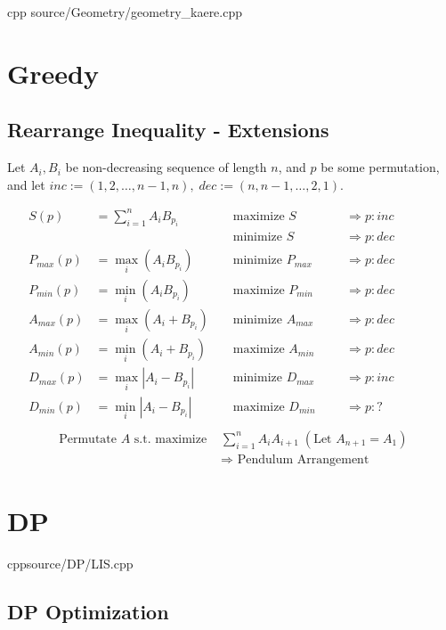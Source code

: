 \documentclass[landscape, 8pt, a4paper, oneside]{extarticle}
\begin{document}
\begin{multicols}{3}
{}
{}
{cpp}
{source/Geometry/geometry_kaere.cpp}

\section{Greedy}
\subsection{Rearrange Inequality - Extensions}
Let $A_i, B_i$ be non-decreasing sequence of length $n$, and $p$ be some permutation, and let $inc := (1, 2, \dots, n-1, n), \;dec := (n, n-1, \dots, 2, 1)$.

\begin{align*}
S(p) &= \sum_{i=1}^n A_i B_{p_i} 
    && \text{ maximize } S  &&&\Rightarrow p : inc&&&&\\
    & && \text{ minimize } S &&&\Rightarrow p:dec&&&&\\
P_{max}(p) &= \max_i(A_iB_{p_i})
    && \text{ minimize } P_{max} &&&\Rightarrow p : dec&&&&\\
P_{min}(p) &= \min_i(A_iB_{p_i})
    && \text{ maximize } P_{min} &&&\Rightarrow p:dec&&&&\\
A_{max}(p) &= \max_i(A_i+B_{p_i}) && \text 
{ minimize } A_{max} &&& \Rightarrow p:dec&&&&\\
A_{min}(p) &= \min_i(A_i+B_{p_i}) && \text{ maximize } A_{min} &&& \Rightarrow p:dec&&&&\\
D_{max}(p) &= \max_i|A_i-B_{p_i}| && \text{ minimize } D_{max} &&& \Rightarrow p:inc&&&&\\
D_{min}(p) &= \min_i|A_i-B_{p_i}| && \text{ maximize } D_{min} &&& \Rightarrow p:?&&&&\\
\end{align*}
\begin{align*}
    \text{ Permutate } A \text{ s.t.} \text{ maximize } & \sum_{i=1}^n {A_i A_{i+1}} \;(\text{Let } A_{n+1} = A_1) \\ &\Rightarrow \text{ Pendulum Arrangement }
\end{align*}

\section{DP}

{}{}{cpp}{source/DP/LIS.cpp}

\subsection{DP Optimization}


\end{multicols}
\end{document}
